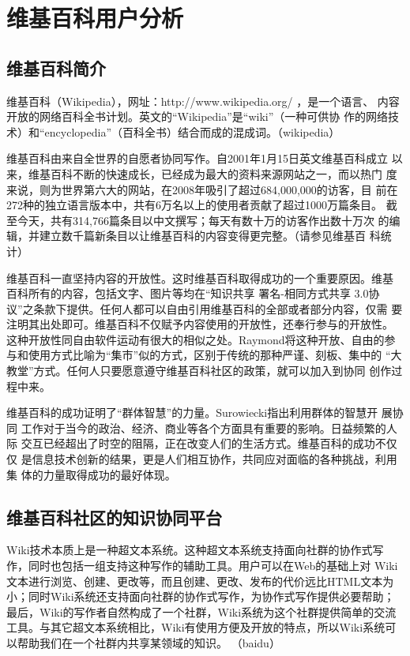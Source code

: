 
\chapter{维基百科用户分析}
\label{cha:wikipedian}

\section{维基百科简介}
维基百科（Wikipedia），网址：http://www.wikipedia.org/  ，是一个语言、
内容开放的网络百科全书计划。英文的“Wikipedia”是“wiki”（一种可供协
作的网络技术）和“encyclopedia”（百科全书）结合而成的混成词。（wikipedia）

维基百科由来自全世界的自愿者协同写作。自2001年1月15日英文维基百科成立
以来，维基百科不断的快速成长，已经成为最大的资料来源网站之一，而以热门
度来说，则为世界第六大的网站，在2008年吸引了超过684,000,000的访客，目
前在272种的独立语言版本中，共有6万名以上的使用者贡献了超过1000万篇条目。
截至今天，共有314,766篇条目以中文撰写；每天有数十万的访客作出数十万次
的编辑，并建立数千篇新条目以让维基百科的内容变得更完整。（请参见维基百
科统计）

维基百科一直坚持内容的开放性。这时维基百科取得成功的一个重要原因。维基
百科所有的内容，包括文字、图片等均在“知识共享 署名-相同方式共享 3.0协
议”之条款下提供。任何人都可以自由引用维基百科的全部或者部分内容，仅需
要注明其出处即可。维基百科不仅赋予内容使用的开放性，还奉行参与的开放性。
这种开放性同自由软件运动有很大的相似之处。Raymond将这种开放、自由的参
与和使用方式比喻为“集市”似的方式，区别于传统的那种严谨、刻板、集中的
“大教堂”方式。任何人只要愿意遵守维基百科社区的政策，就可以加入到协同
创作过程中来。

维基百科的成功证明了“群体智慧”的力量。Surowiecki指出利用群体的智慧开
展协同
工作对于当今的政治、经济、商业等各个方面具有重要的影响。日益频繁的人际
交互已经超出了时空的阻隔，正在改变人们的生活方式。维基百科的成功不仅仅
是信息技术创新的结果，更是人们相互协作，共同应对面临的各种挑战，利用集
体的力量取得成功的最好体现。

\section{维基百科社区的知识协同平台}

Wiki技术本质上是一种超文本系统。这种超文本系统支持面向社群的协作式写
作，同时也包括一组支持这种写作的辅助工具。用户可以在Web的基础上对 Wiki
文本进行浏览、创建、更改等，而且创建、更改、发布的代价远比HTML文本为
小；同时Wiki系统还支持面向社群的协作式写作，为协作式写作提供必要帮助；
最后，Wiki的写作者自然构成了一个社群，Wiki系统为这个社群提供简单的交流
工具。与其它超文本系统相比，Wiki有使用方便及开放的特点，所以Wiki系统可
以帮助我们在一个社群内共享某领域的知识。 （baidu）

